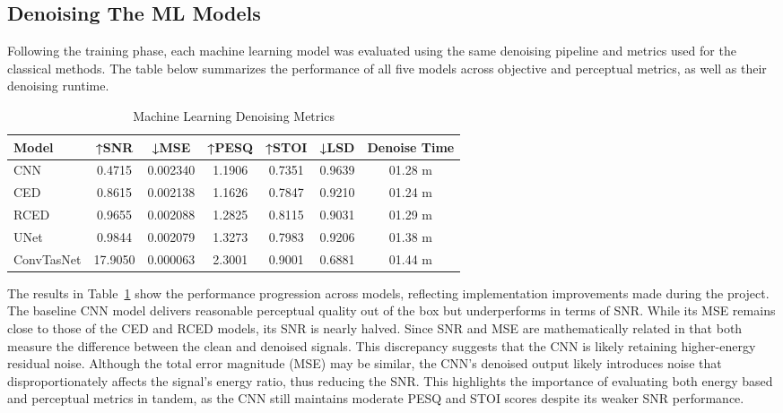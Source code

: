 \subsection{Denoising The ML Models}
\label{sec:denoising_ml_models}

Following the training phase, each machine learning model was evaluated using the same denoising pipeline and metrics used for the classical methods. The table below summarizes the performance of all five models across objective and perceptual metrics, as well as their denoising runtime.

\vspace{1em}
\begin{table}[H]
\centering
\caption{Machine Learning Denoising Metrics}
\label{tab:ml_denoise}
\begin{tabular}{|l|c|c|c|c|c|c|}
\hline
\textbf{Model} & \textbf{↑SNR} & \textbf{↓MSE} & \textbf{↑PESQ} & \textbf{↑STOI} & \textbf{↓LSD} & \textbf{Denoise Time} \\
\hline
CNN         & 0.4715  & 0.002340 & 1.1906 & 0.7351 & 0.9639 & 01.28 m \\
CED         & 0.8615  & 0.002138 & 1.1626 & 0.7847 & 0.9210 & 01.24 m \\
RCED        & 0.9655  & 0.002088 & 1.2825 & 0.8115 & 0.9031 & 01.29 m \\
UNet        & 0.9844  & 0.002079 & 1.3273 & 0.7983 & 0.9206 & 01.38 m \\
ConvTasNet  & 17.9050 & 0.000063 & 2.3001 & 0.9001 & 0.6881 & 01.44 m \\
\hline
\end{tabular}
\end{table}

The results in Table~\ref{tab:ml_denoise} show the performance progression across models, reflecting implementation improvements made during the project. The baseline CNN model delivers reasonable perceptual quality out of the box but underperforms in terms of SNR. While its MSE remains close to those of the CED and RCED models, its SNR is nearly halved. Since SNR and MSE are mathematically related in that both measure the difference between the clean and denoised signals. This discrepancy suggests that the CNN is likely retaining higher-energy residual noise. Although the total error magnitude (MSE) may be similar, the CNN's denoised output likely introduces noise that disproportionately affects the signal's energy ratio, thus reducing the SNR. This highlights the importance of evaluating both energy based and perceptual metrics in tandem, as the CNN still maintains moderate PESQ and STOI scores despite its weaker SNR performance.

